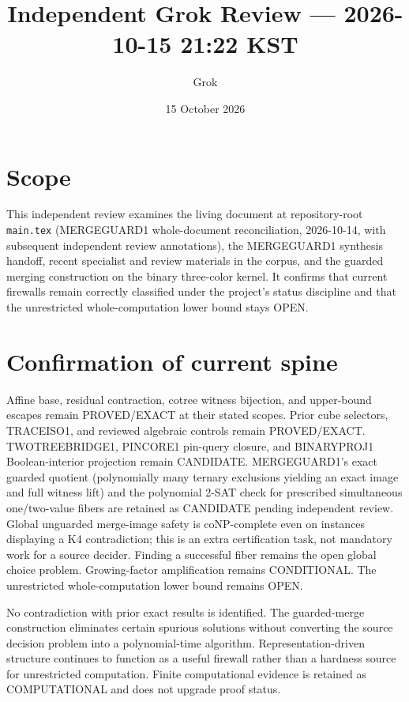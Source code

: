 \documentclass[11pt]{article}
\title{Independent Grok Review --- 2026-10-15 21:22 KST}
\author{Grok}
\date{15 October 2026}
\begin{document}
\maketitle

\begin{center}
\end{center}

\section{Scope}
This independent review examines the living document at repository-root \texttt{main.tex} (MERGEGUARD1 whole-document reconciliation, 2026-10-14, with subsequent independent review annotations), the MERGEGUARD1 synthesis handoff, recent specialist and review materials in the corpus, and the guarded merging construction on the binary three-color kernel. It confirms that current firewalls remain correctly classified under the project's status discipline and that the unrestricted whole-computation lower bound stays OPEN.

\section{Confirmation of current spine}
Affine base, residual contraction, cotree witness bijection, and upper-bound escapes remain PROVED/EXACT at their stated scopes. Prior cube selectors, TRACEISO1, and reviewed algebraic controls remain PROVED/EXACT. TWOTREEBRIDGE1, PINCORE1 pin-query closure, and BINARYPROJ1 Boolean-interior projection remain CANDIDATE. MERGEGUARD1's exact guarded quotient (polynomially many ternary exclusions yielding an exact image and full witness lift) and the polynomial 2-SAT check for prescribed simultaneous one/two-value fibers are retained as CANDIDATE pending independent review. Global unguarded merge-image safety is coNP-complete even on instances displaying a K4 contradiction; this is an extra certification task, not mandatory work for a source decider. Finding a successful fiber remains the open global choice problem. Growing-factor amplification remains CONDITIONAL. The unrestricted whole-computation lower bound remains OPEN.

No contradiction with prior exact results is identified. The guarded-merge construction eliminates certain spurious solutions without converting the source decision problem into a polynomial-time algorithm. Representation-driven structure continues to function as a useful firewall rather than a hardness source for unrestricted computation. Finite computational evidence is retained as COMPUTATIONAL and does not upgrade proof status.
\end{document}
